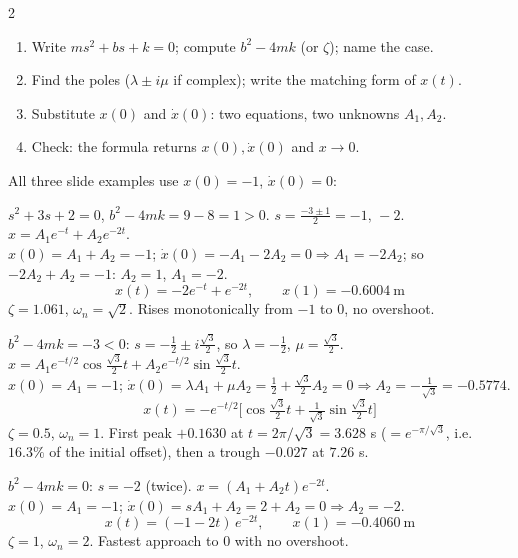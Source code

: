 \begin{multicols}{2}
\begin{recipe}
\label{w8:smd}
\begin{enumerate}
\item Write $ms^2+bs+k=0$; compute $b^2-4mk$ (or $\zeta$); name the case.
\item Find the poles ($\lambda\pm i\mu$ if complex); write the matching form of $x(t)$.
\item Substitute $x(0)$ and $\dot x(0)$: two equations, two unknowns $A_1,A_2$.
\item Check: the formula returns $x(0),\dot x(0)$ and $x\to0$.
\end{enumerate}
\end{recipe}
All three slide examples use $x(0)=-1$, $\dot x(0)=0$:
\begin{worked}[over-damped, $m,b,k=1,3,2$ \pg{19, 20}]
$s^2+3s+2=0$, $b^2-4mk=9-8=1>0$. $s=\frac{-3\pm1}2=-1,\,-2$. $x=A_1e^{-t}+A_2e^{-2t}$.\\
$x(0)=A_1+A_2=-1$; $\dot x(0)=-A_1-2A_2=0\Rightarrow A_1=-2A_2$; so $-2A_2+A_2=-1$: $A_2=1$, $A_1=-2$.
\[x(t)=-2e^{-t}+e^{-2t},\qquad x(1)=-0.6004\ \text{m}\]
$\zeta=1.061$, $\omega_n=\sqrt2$. Rises monotonically from $-1$ to $0$, no overshoot. \chk
\end{worked}
\begin{worked}[under-damped, $m,b,k=1,1,1$ \pg{21--23}]
$b^2-4mk=-3<0$: $s=-\tfrac12\pm i\tfrac{\sqrt3}2$, so $\lambda=-\tfrac12$, $\mu=\tfrac{\sqrt3}2$. $x=A_1e^{-t/2}\cos\tfrac{\sqrt3}2t+A_2e^{-t/2}\sin\tfrac{\sqrt3}2t$.\\
$x(0)=A_1=-1$; $\dot x(0)=\lambda A_1+\mu A_2=\tfrac12+\tfrac{\sqrt3}2A_2=0\Rightarrow A_2=-\tfrac1{\sqrt3}=-0.5774$.
\[x(t)=-e^{-t/2}\Big[\cos\tfrac{\sqrt3}2t+\tfrac1{\sqrt3}\sin\tfrac{\sqrt3}2t\Big]\]
$\zeta=0.5$, $\omega_n=1$. First peak $+0.1630$ at $t=2\pi/\sqrt3=3.628$ s ($=e^{-\pi/\sqrt3}$, i.e.\ $16.3\%$ of the initial offset), then a trough $-0.027$ at $7.26$ s. \chk
\end{worked}
\begin{worked}[critically damped, $m,b,k=1,4,4$ \pg{24--26}]
$b^2-4mk=0$: $s=-2$ (twice). $x=(A_1+A_2t)e^{-2t}$.\\
$x(0)=A_1=-1$; $\dot x(0)=sA_1+A_2=2+A_2=0\Rightarrow A_2=-2$.
\[x(t)=(-1-2t)\,e^{-2t},\qquad x(1)=-0.4060\ \text{m}\]
$\zeta=1$, $\omega_n=2$. Fastest approach to $0$ with no overshoot. \chk
\end{worked}

\end{multicols}
